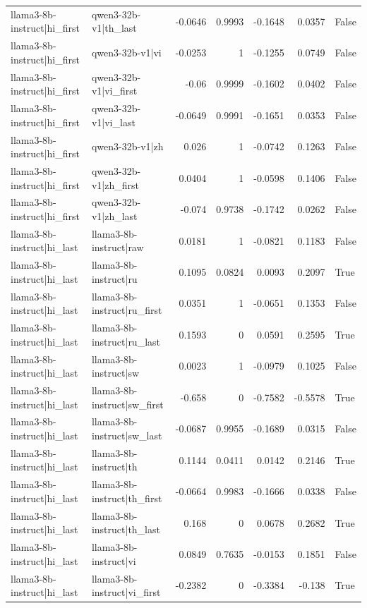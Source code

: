 \begin{table}
\begin{tabular}{l l r r r r l}
llama3-8b-instruct|hi_first & qwen3-32b-v1|th_last & -0.0646 & 0.9993 & -0.1648 & 0.0357 & False \\
llama3-8b-instruct|hi_first & qwen3-32b-v1|vi & -0.0253 & 1 & -0.1255 & 0.0749 & False \\
llama3-8b-instruct|hi_first & qwen3-32b-v1|vi_first & -0.06 & 0.9999 & -0.1602 & 0.0402 & False \\
llama3-8b-instruct|hi_first & qwen3-32b-v1|vi_last & -0.0649 & 0.9991 & -0.1651 & 0.0353 & False \\
llama3-8b-instruct|hi_first & qwen3-32b-v1|zh & 0.026 & 1 & -0.0742 & 0.1263 & False \\
llama3-8b-instruct|hi_first & qwen3-32b-v1|zh_first & 0.0404 & 1 & -0.0598 & 0.1406 & False \\
llama3-8b-instruct|hi_first & qwen3-32b-v1|zh_last & -0.074 & 0.9738 & -0.1742 & 0.0262 & False \\
llama3-8b-instruct|hi_last & llama3-8b-instruct|raw & 0.0181 & 1 & -0.0821 & 0.1183 & False \\
llama3-8b-instruct|hi_last & llama3-8b-instruct|ru & 0.1095 & 0.0824 & 0.0093 & 0.2097 & True \\
llama3-8b-instruct|hi_last & llama3-8b-instruct|ru_first & 0.0351 & 1 & -0.0651 & 0.1353 & False \\
llama3-8b-instruct|hi_last & llama3-8b-instruct|ru_last & 0.1593 & 0 & 0.0591 & 0.2595 & True \\
llama3-8b-instruct|hi_last & llama3-8b-instruct|sw & 0.0023 & 1 & -0.0979 & 0.1025 & False \\
llama3-8b-instruct|hi_last & llama3-8b-instruct|sw_first & -0.658 & 0 & -0.7582 & -0.5578 & True \\
llama3-8b-instruct|hi_last & llama3-8b-instruct|sw_last & -0.0687 & 0.9955 & -0.1689 & 0.0315 & False \\
llama3-8b-instruct|hi_last & llama3-8b-instruct|th & 0.1144 & 0.0411 & 0.0142 & 0.2146 & True \\
llama3-8b-instruct|hi_last & llama3-8b-instruct|th_first & -0.0664 & 0.9983 & -0.1666 & 0.0338 & False \\
llama3-8b-instruct|hi_last & llama3-8b-instruct|th_last & 0.168 & 0 & 0.0678 & 0.2682 & True \\
llama3-8b-instruct|hi_last & llama3-8b-instruct|vi & 0.0849 & 0.7635 & -0.0153 & 0.1851 & False \\
llama3-8b-instruct|hi_last & llama3-8b-instruct|vi_first & -0.2382 & 0 & -0.3384 & -0.138 & True \\

\end{tabular}
\end{table}
